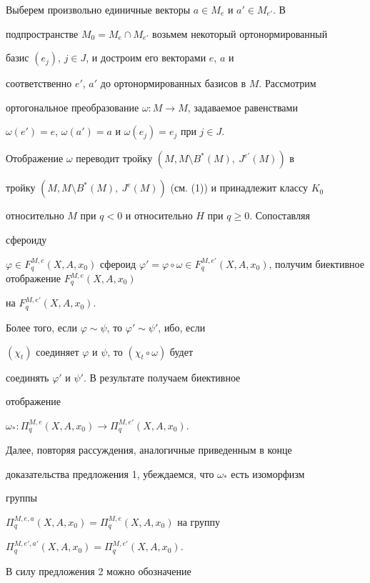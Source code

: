 \begin{pf} 


Выберем произвольно единичные векторы $a\in M_e$ и $a'\in M_{e'}$. В 


подпространстве $M_0=M_e\cap M_{e'}$ возьмем некоторый ортонормированный 


базис $(e_j)$, $j\in J$, и достроим его векторами $e$, $a$ и 


соответственно $e'$, $a'$ до ортонормированных базисов в $M$. Рассмотрим 


ортогональное преобразование $\omega:M\to M$, задаваемое равенствами 


$\omega(e')=e$, $\omega(a')=a$ и $\omega(e_j)=e_j$ при $j\in J$. 


Отображение $\omega$ переводит тройку $(M,M\setminus B^*(M),\ J^{e'}(M))$ в 


тройку $(M,M\setminus B^*(M),\ J^e(M))$ (см. (1)) и принадлежит классу $K_0$ 


относительно $M$ при $q<0$ и относительно $H$ при $q\ge0$. Сопоставляя 


сфероиду 


$\varphi\in F^{M,e}_q(X,A,x_0)$ сфероид $\varphi'=\varphi\circ\omega\in 


F^{M,e'}_q(X,A,x_0)$, получим биективное отображение $F^{M,e}_q(X,A,x_0)$ 


на $F^{M,e'}_q(X,A,x_0)$. 


Более того, если $\varphi\sim\psi$, то $\varphi'\sim\psi'$, ибо, если 


$(\chi_t)$ соединяет $\varphi$ и $\psi$, то $(\chi_t\circ\omega)$ будет 


соединять $\varphi'$ и $\psi'$. В результате получаем биективное 


отображение 


$\omega_*:\Pi^{M,e}_q(X,A,x_0)\to\Pi^{M,e'}_q(X,A,x_0)$. 


Далее, повторяя рассуждения, аналогичные приведенным в конце 


доказательства предложения 1, убеждаемся, что $\omega_*$ есть изоморфизм 


группы 


$\Pi^{M,e,a}_q(X,A,x_0)=\Pi^{M,e}_q(X,A,x_0)$ на группу 


$\Pi^{M,e',a'}_q(X,A,x_0)=\Pi^{M,e'}_q(X,A,x_0)$. 


\end{pf} 


 


В силу предложения 2 можно обозначение 


